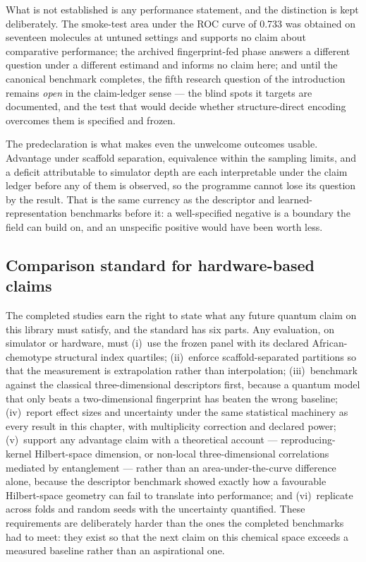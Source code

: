 What is not established is any performance statement, and the distinction is kept deliberately. The smoke-test area under the ROC curve of \num{0.733} was obtained on seventeen molecules at untuned settings and supports no claim about comparative performance; the archived fingerprint-fed phase answers a different question under a different estimand and informs no claim here; and until the canonical benchmark completes, the fifth research question of the introduction remains \emph{open} in the claim-ledger sense --- the blind spots it targets are documented, and the test that would decide whether structure-direct encoding overcomes them is specified and frozen.

The predeclaration is what makes even the unwelcome outcomes usable. Advantage under scaffold separation, equivalence within the sampling limits, and a deficit attributable to simulator depth are each interpretable under the claim ledger before any of them is observed, so the programme cannot lose its question by the result. That is the same currency as the descriptor and learned-representation benchmarks before it: a well-specified negative is a boundary the field can build on, and an unspecific positive would have been worth less.

\subsection{Comparison standard for hardware-based claims}\label{sec:res_qmse_standard}

The completed studies earn the right to state what any future quantum claim on this library must satisfy, and the standard has six parts. Any evaluation, on simulator or hardware, must (i)~use the frozen panel with its declared African-chemotype structural index quartiles; (ii)~enforce scaffold-separated partitions so that the measurement is extrapolation rather than interpolation; (iii)~benchmark against the classical three-dimensional descriptors first, because a quantum model that only beats a two-dimensional fingerprint has beaten the wrong baseline; (iv)~report effect sizes and uncertainty under the same statistical machinery as every result in this chapter, with multiplicity correction and declared power; (v)~support any advantage claim with a theoretical account --- reproducing-kernel Hilbert-space dimension, or non-local three-dimensional correlations mediated by entanglement --- rather than an area-under-the-curve difference alone, because the descriptor benchmark showed exactly how a favourable Hilbert-space geometry can fail to translate into performance; and (vi)~replicate across folds and random seeds with the uncertainty quantified. These requirements are deliberately harder than the ones the completed benchmarks had to meet: they exist so that the next claim on this chemical space exceeds a measured baseline rather than an aspirational one.

